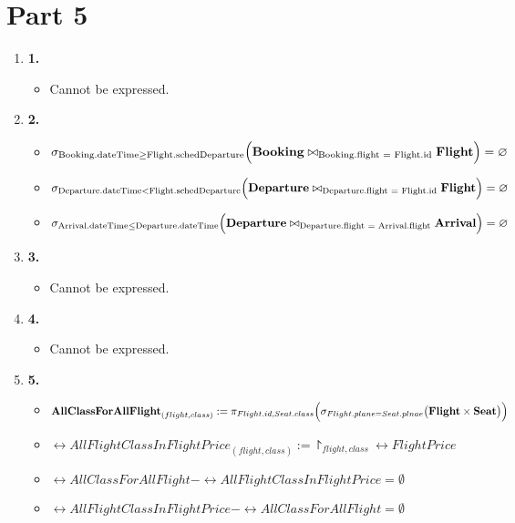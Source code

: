 \section*{Part 5}


\begin{enumerate}[label=]
    \item \textbf{1.} 
    \begin{itemize}[label=]
        \item Cannot be expressed.
    \end{itemize}

    \item \textbf{2.} 
    \begin{itemize}[label=]
        \item $\sigma_{\text{Booking.dateTime} \geq \text{Flight.schedDeparture}} \Big( \textbf{Booking} \bowtie_{\text{Booking.flight = Flight.id}} \textbf{Flight} \Big) = \varnothing$
        \item $\sigma_{\text{Departure.dateTime} < \text{Flight.schedDeparture}} \Big( \textbf{Departure} \bowtie_{\text{Departure.flight = Flight.id}} \textbf{Flight} \Big) = \varnothing$
        \item $\sigma_{\text{Arrival.dateTime} \leq \text{Departure.dateTime}} \Big( \textbf{Departure} \bowtie_{\text{Departure.flight = Arrival.flight}} \textbf{Arrival} \Big) = \varnothing$
        
    \end{itemize}
    \item \textbf{3.} 
    \begin{itemize}[label=]
        \item Cannot be expressed.
    \end{itemize}

    \item \textbf{4.} 
    \begin{itemize}[label=]
        \item Cannot be expressed.
    \end{itemize}

    \item \textbf{5.} 
    \begin{itemize}[label=]
        \item $\textbf{AllClassForAllFlight}_{(flight, class)} := \pi_{Flight.id, Seat.class} \Big( \sigma_{Flight.plane = Seat.plnae} \big(\textbf{Flight} \times \textbf{Seat}\big) \Big)$
        \item $\rel{AllFlightClassInFlightPrice}_{(flight, class)} := \project_{flight, class} \rel{FlightPrice}$
        \item $\rel{AllClassForAllFlight} - \rel{AllFlightClassInFlightPrice} = \emptyset$
        \item $\rel{AllFlightClassInFlightPrice} - \rel{AllClassForAllFlight} = \emptyset$
    \end{itemize}


\end{enumerate}
